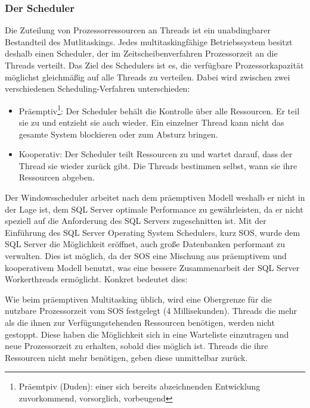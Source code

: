         \subsubsection{Der Scheduler}
          Die Zuteilung von Prozessorressourcen an Threads ist ein unabdingbarer
          Bestandteil des Mutlitaskings. Jedes multitaskingfähige Betriebssystem
          besitzt deshalb einen Scheduler, der im Zeitscheibenverfahren
          Prozessorzeit an die Threads verteilt. Das Ziel des Schedulers ist es,
          die verfügbare Prozessorkapazität möglichst gleichmäßig auf
          alle Threads zu verteilen. Dabei wird zwischen zwei verschiedenen
          Scheduling-Verfahren unterschieden:
          \begin{itemize}
            \item Präemptiv\footnote{Präemtpiv (Duden): einer sich bereits
            abzeichnenden Entwicklung zuvorkommend, vorsorglich, vorbeugend}: Der
            Scheduler behält die Kontrolle über alle Ressourcen. Er teil sie
            zu und entzieht sie auch wieder. Ein einzelner Thread kann nicht das
            gesamte System blockieren oder zum Absturz bringen.
            \item Kooperativ: Der Scheduler teilt Ressourcen zu und wartet darauf,
            dass der Thread sie wieder zurück gibt. Die Threads bestimmen
            selbst, wann sie ihre Ressourcen abgeben.
          \end{itemize}
          Der Windowsscheduler arbeitet nach dem präemptiven Modell weshalb er
          nicht in der Lage ist, dem SQL Server optimale Performance zu
          gewährleisten, da er nicht speziell auf die Anforderung des SQL
          Servers zugeschnitten ist. Mit der Einführung des SQL Server Operating
          System Schedulers, kurz SOS, wurde dem SQL Server die Möglichkeit
          eröffnet, auch große Datenbanken performant zu verwalten. Dies ist
          möglich, da der SOS eine Mischung aus präemptivem und kooperativem
          Modell benutzt, was eine bessere Zusammenarbeit der SQL Server
          Workerthreads ermöglicht. Konkret bedeutet dies:
  
          Wie beim präemptiven Multitasking üblich, wird eine Obergrenze für
          die nutzbare  Prozessorzeit vom SOS festgelegt (4 Millisekunden).
          Threads die mehr als die ihnen zur Verfügungstehenden Ressourcen
          benötigen, werden nicht gestoppt. Diese haben die Möglichkeit sich
          in eine Warteliste einzutragen und neue Prozessorzeit zu erhalten,
          sobald dies möglich ist. Threads die ihre Ressourcen nicht mehr
          benötigen, geben diese unmittelbar zurück.
  
